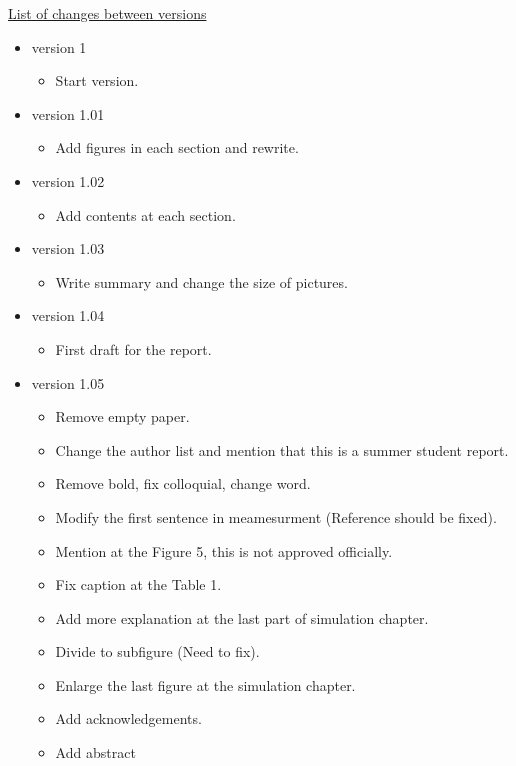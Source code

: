 \underline{List of changes between versions}

\begin{itemize}


\item version 1 
\begin{itemize}
\item Start version.
\end{itemize}

\item version 1.01
\begin{itemize}
\item Add figures in each section and rewrite.
\end{itemize}

\item version 1.02
\begin{itemize}
\item Add contents at each section.
\end{itemize}

\item version 1.03
\begin{itemize}
\item Write summary and change the size of pictures.
\end{itemize}

\item version 1.04
\begin{itemize}
\item First draft for the report.
\end{itemize}

\item version 1.05
\begin{itemize}
\item Remove empty paper.
\item Change the author list and mention that this is a summer student report.
\item Remove bold, fix colloquial, change word.
\item Modify the first sentence in meamesurment (Reference should be fixed).
\item Mention at the Figure 5, this is not approved officially.
\item Fix caption at the Table 1.
\item Add more explanation at the last part of simulation chapter.
\item Divide to subfigure (Need to fix).
\item Enlarge the last figure at the simulation chapter.
\item Add acknowledgements.
\item Add abstract
\end{itemize}


\end{itemize}
